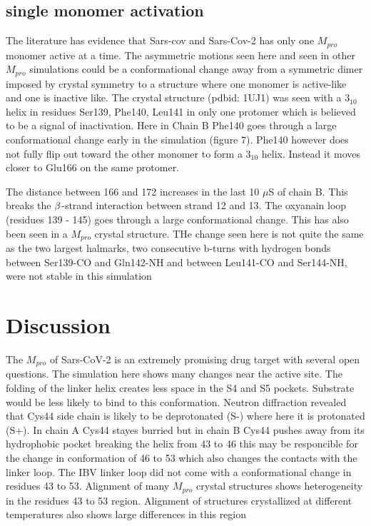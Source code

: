 \documentclass{biophys-new}
\begin{document}
\subsection*{single monomer activation}

The literature has evidence that Sars-cov\cite{chen2006only} and Sars-Cov-2 has only one $M_{pro}$ monomer active at a time. The asymmetric motions seen here and seen in other $M_{pro}$ simulations\cite{inizan2021high} could be a conformational change away from a symmetric dimer imposed by crystal symmetry to a structure where one monomer is active-like and one is inactive like. The crystal structure (pdbid: 1UJ1) was seen with a $3_{10}$ helix in residues Ser139, Phe140, Leu141 in only one protomer which is believed to be a signal of inactivation. Here in Chain B Phe140 goes through a large conformational change early in the simulation (figure 7). Phe140 however does not fully flip out toward the other monomer to form a $3_{10}$ helix. Instead it moves closer to Glu166 on the same protomer.

The distance between 166 and 172 increases in the last 10 $\mu$S of chain B. This breaks the $\MakeUppercase{\beta}$-strand interaction between strand 12 and 13. The oxyanain loop (residues 139 - 145) goes through a large conformational change. This has also been seen in a $M_{pro}$ crystal structure. \cite{fornasier2021novel} THe change seen here is not quite the same as the two largest halmarks, two consecutive b-turns with hydrogen bonds between Ser139-CO and Gln142-NH and between Leu141-CO and Ser144-NH, were not stable in this simulation

\section*{Discussion}

The $M_{pro}$ of Sars-CoV-2 is an extremely promising drug target with several open questions. The simulation here shows many changes near the active site. The folding of the linker helix creates less space in the S4 and S5 pockets. Substrate would be less likely to bind to this conformation. Neutron diffraction revealed that Cys44 side chain is likely to be deprotonated (S-) where here it is protonated (S+)\cite{kneller2020unusual}. In chain A Cys44 stayes burried but in chain B Cys44 pushes away from its hydrophobic pocket breaking the helix from 43 to 46 this may be responcible for the change in conformation of 46 to 53 which also changes the contacts with the linker loop. The IBV linker loop did not come with a conformational change in residues 43 to 53. Alignment of many $M_{pro}$ crystal structures shows heterogeneity in the residues 43 to 53 region. \cite{jaskolski2021crystallographic} Alignment of structures crystallized at different temperatures also shows large differences in this region
\end{document}
